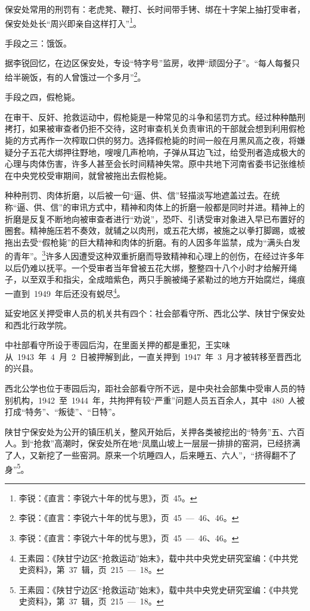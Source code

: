 保安处常用的刑罚有：老虎凳、鞭打、长时间带手铐、绑在十字架上抽打受审者，保安处处长“周兴即亲自这样打入”\footnote{李锐：《直言：李锐六十年的忧与思》，页~45。}。

手段之三：饿饭。

据李锐回忆，在边区保安处，专设“特字号”监房，收押“顽固分子”。“每人每餐只给半碗饭，有的人曾饿过一个多月”\footnote{李锐：《直言：李锐六十年的忧与思》，页~45~—~46、46。}。

手段之四，假枪毙。

在审干、反奸、抢救运动中，假枪毙是一种常见的斗争和惩罚方式。经过种种酷刑拷打，如果被审查者仍拒不交待，这时审查机关负责审讯的干部就会想到利用假枪毙的方式再作一次榨取口供的努力。选择假枪毙的时间一般在月黑风高之夜，将嫌疑分子五花大绑押往野地，嗖嗖几声枪响，子弹从耳边飞过，给受刑者造成极大的心理与肉体伤害，许多人甚至会长时间精神失常。原中共地下河南省委书记张维桢在中央党校受审期间，就曾被拖出去假枪毙。

种种刑罚、肉体折磨，以后被一句“逼、供、信”轻描淡写地遮盖过去。在统称“逼、供、信”的审讯方式中，精神和肉体上的折磨一般都是同时并进。精神上的折磨是反复不断地向被审查者进行“劝说”，恐吓、引诱受审对象进入早已布置好的圈套。精神施压若不奏效，就辅之以肉刑，或五花大绑，被施之以拳打脚踢，或被拖出去受“假枪毙”的巨大精神和肉体的折磨。有的人因多年监禁，成为“满头白发的青年”。\footnote{李锐：《直言：李锐六十年的忧与思》，页~45~—~46、46。}许多人因遭受这种双重折磨而导致精神和心理上的创伤，在经过许多年以后仍难以抚平。一个受审者当年曾被五花大绑，整整四十八个小时才给解开绳子，以至双手和指尖，全成暗紫色，两只手腕被绳子紧勒过的地方开始腐烂，绳痕一直到~1949~年后还没有蜕尽\footnote{王素园：《陕甘宁边区“抢救运动”始末》，载中共中央党史研究室编：《中共党史资料》，第~37~辑，页~215~—~18。}。

延安地区关押受审人员的机关共有四个：社会部看守所、西北公学、陕甘宁保安处和西北行政学院。

中社部看守所设于枣园后沟，在里面关押的都是重犯，王实味从~1943~年~4~月~2~日被押解到此，一直关押到~1947~年~3~月才被转移至晋西北的兴县。

西北公学也位于枣园后沟，距社会部看守所不远，是中央社会部集中受审人员的特别机构，1942~至~1944~年，共拘押有较“严重”问题人员五百余人，其中~480~人被打成“特务”、“叛徒”、“日特”。

陕甘宁保安处为公开的镇压机关，整风开始后，关押各类被挖出的“特务”五、六百人。到“抢救”高潮时，保安处所在地“凤凰山坡上一层层一排排的窑洞，已经挤满了人，又新挖了一些窑洞。原来一个坑睡四人，后来睡五、六人”，“挤得翻不了身”\footnote{王素园：《陕甘宁边区“抢救运动”始末》，载中共中央党史研究室编：《中共党史资料》，第~37~辑，页~215~—~18。}。

